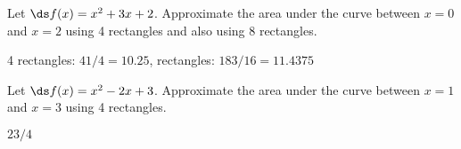 \begin{exercises}
\begin{exercise} Let $\ds f(x)=x^2+3x+2$. Approximate the area under the curve
between $x=0$ and $x=2$ using 4 rectangles and also using 8
rectangles. 
\begin{answer} 4 rectangles: $41/4=10.25$,\hfill{} rectangles: $183/16= 11.4375$
\end{answer}\end{exercise}

\begin{exercise} Let $\ds f(x)=x^2-2x+3$. Approximate the area under the curve
between $x=1$ and $x=3$ using 4 rectangles. 
\begin{answer} $ 23/4$
\end{answer}\end{exercise}

\end{exercises}


